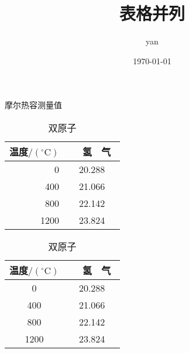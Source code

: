 \documentclass[a4paper]{article}
\title{表格并列}
\author{yan}
\date{\today}
\begin{document}
	

\begin{table}[htbp]
\begin{minipage}{.5\linewidth}
\centering
\caption{摩尔热容测量值}
\begin{tabular}{rc}
\hline 
{ }温度$/(\mathrm{^\circ C})${ } & {　}氢{　}气{　}  \\
\hline
  0\quad{　}  & 20.288  \\
400\quad{　}  & 21.066  \\
800\quad{　}  & 22.142  \\
1200\quad{　} & 23.824  \\
\hline 
\end{tabular}
\end{minipage}\begin{minipage}{.5\linewidth}  
\centering
\caption{双原子}
\begin{tabular}{cc}
\hline 
{ }温度$/(\mathrm{^\circ C})${ } & {　}氢{　}气{　} \\
\hline
  0\quad{　}  & 20.288  \\
400\quad{　}  & 21.066  \\
800\quad{　}  & 22.142  \\
1200\quad{　} & 23.824  \\
\hline 
\end{tabular}
\end{minipage}
\end{table}
\end{document}
